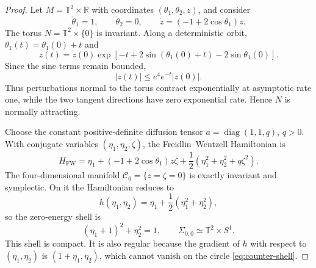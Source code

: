 \documentclass[11pt]{article}
\theoremstyle{definition}
\theoremstyle{remark}
\newcommand{\R}{\mathbb{R}}
\newcommand{\T}{\mathbb{T}}
\newcommand{\C}{\mathcal{C}}
\newcommand{\Hs}{H_{\mathrm{FW}}}
\newcommand{\diag}{\operatorname{diag}}
\begin{document}
\begin{proof}
Let $M=\T^2\times\R$ with coordinates $(\theta_1,\theta_2,z)$, and consider
\begin{equation}
\dot\theta_1=1,
\qquad
\dot\theta_2=0,
\qquad
\dot z=(-1+2\cos\theta_1)z.
\label{eq:counter-drift}
\end{equation}
The torus $N=\T^2\times\{0\}$ is invariant.  Along a deterministic orbit, $\theta_1(t)=\theta_1(0)+t$ and
\[
z(t)=z(0)\exp\!\left[-t+2\sin(\theta_1(0)+t)-2\sin\theta_1(0)\right].
\]
Since the sine terms remain bounded,
\[
|z(t)|\le e^4e^{-t}|z(0)|.
\]
Thus perturbations normal to the torus contract exponentially at asymptotic rate one, while the two tangent directions have zero exponential rate.  Hence $N$ is normally attracting.

Choose the constant positive-definite diffusion tensor $a=\diag(1,1,q)$, $q>0$.  With conjugate variables $(\eta_1,\eta_2,\zeta)$, the Freidlin--Wentzell Hamiltonian is
\begin{equation}
\Hs
=
\eta_1+(-1+2\cos\theta_1)z\zeta
+\frac12(\eta_1^2+\eta_2^2+q\zeta^2).
\label{eq:counter-H}
\end{equation}
The four-dimensional manifold $\C_0=\{z=\zeta=0\}$ is exactly invariant and symplectic.  On it the Hamiltonian reduces to
\[
h(\eta_1,\eta_2)=\eta_1+\frac12(\eta_1^2+\eta_2^2),
\]
so the zero-energy shell is
\begin{equation}
(\eta_1+1)^2+\eta_2^2=1,
\qquad
\Sigma_{0,0}\simeq\T^2\times S^1.
\label{eq:counter-shell}
\end{equation}
This shell is compact.  It is also regular because the gradient of $h$ with respect to $(\eta_1,\eta_2)$ is $(1+\eta_1,\eta_2)$, which cannot vanish on the circle \eqref{eq:counter-shell}.


\end{proof}
\end{document}
